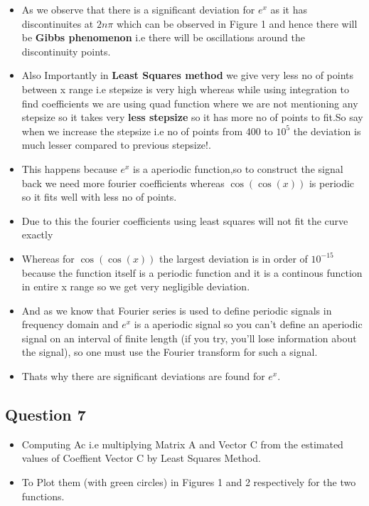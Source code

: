 \documentclass[a4paper]{article}
\providecommand{\tightlist}{%
      \setlength{\itemsep}{0pt}\setlength{\parskip}{0pt}}
\begin{document}
\begin{itemize}
\tightlist
\item
  As we observe that there is a significant deviation for \(e^{x}\) as
  it has discontinuites at \(2n\pi\) which can be observed in Figure 1
  and hence there will be \textbf{Gibbs phenomenon} i.e there will be
  oscillations around the discontinuity points.
\item
  Also Importantly in \textbf{Least Squares method} we give very less no
  of points between x range i.e stepsize is very high whereas while
  using integration to find coefficients we are using quad function
  where we are not mentioning any stepsize so it takes very \textbf{less
  stepsize} so it has more no of points to fit.So say when we increase
  the stepsize i.e no of points from 400 to \(10^{5}\) the deviation is
  much lesser compared to previous stepsize!.
\item
  This happens because \(e^{x}\) is a aperiodic function,so to construct
  the signal back we need more fourier coefficients whereas
  \(\cos(\cos(x))\) is periodic so it fits well with less no of points.
\item
  Due to this the fourier coefficients using least squares will not fit
  the curve exactly
\item
  Whereas for \(\cos(\cos(x))\) the largest deviation is in order of
  \(10^{-15}\) because the function itself is a periodic function and it
  is a continous function in entire x range so we get very negligible
  deviation.
\item
  And as we know that Fourier series is used to define periodic signals
  in frequency domain and \(e^{x}\) is a aperiodic signal so you can't
  define an aperiodic signal on an interval of finite length (if you
  try, you'll lose information about the signal), so one must use the
  Fourier transform for such a signal.
\item
  Thats why there are significant deviations are found for \(e^{x}\).
\end{itemize}

    \subsection{Question 7}\label{question-7}

\begin{itemize}
\tightlist
\item
  Computing Ac i.e multiplying Matrix A and Vector C from the estimated
  values of Coeffient Vector C by Least Squares Method.
\item
  To Plot them (with green circles) in Figures 1 and 2 respectively for
  the two functions.
\end{itemize}
\end{document}
